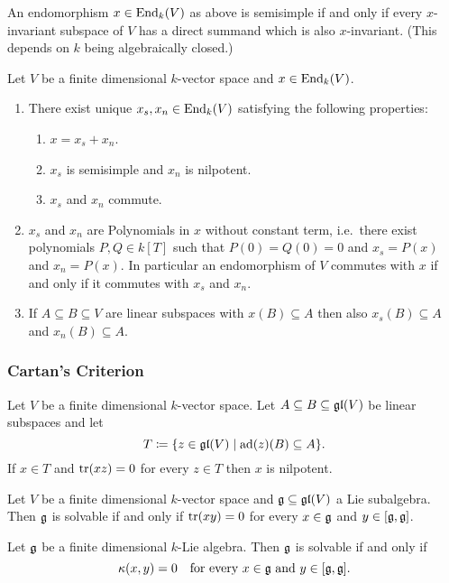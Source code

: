 \begin{rem}
 An endomorphism $x \in \operatorname{End}_k(V)$ as above is semisimple if and only if every $x$-invariant subspace of $V$ has a direct summand which is also $x$-invariant. (This depends on $k$ being algebraically closed.)
\end{rem}


\begin{thrm}
 Let $V$ be a finite dimensional $k$-vector space and $x \in \operatorname{End}_k(V)$.
 \begin{enumerate}[leftmargin=*]
  \item
   There exist unique $x_s, x_n \in \operatorname{End}_k(V)$ satisfying the following properties:
   \begin{enumerate}
    \item
     $x = x_s + x_n$.
    \item
     $x_s$ is semisimple and $x_n$ is nilpotent.
    \item
     $x_s$ and $x_n$ commute.
   \end{enumerate}
  \item
   $x_s$ and $x_n$ are Polynomials in $x$ without constant term, i.e.\ there exist polynomials $P,Q \in k[T]$ such that $P(0) = Q(0) = 0$ and $x_s = P(x)$ and $x_n = P(x)$. In particular an endomorphism of $V$ commutes with $x$ if and only if it commutes with $x_s$ and $x_n$.
  \item
   If $A \subseteq B \subseteq V$ are linear subspaces with $x(B) \subseteq A$ then also $x_s(B) \subseteq A$ and $x_n(B) \subseteq A$.
 \end{enumerate}
\end{thrm}







\subsubsection{Cartan’s Criterion}


\begin{lem}
 Let $V$ be a finite dimensional $k$-vector space. Let $A \subseteq B \subseteq \mathfrak{gl}(V)$ be linear subspaces and let
 \[
  T \coloneqq \{z \in \mathfrak{gl}(V) \mid \operatorname{ad}(z)(B) \subseteq A\}.
 \]
 If $x \in T$ and $\operatorname{tr}(xz) = 0$ for every $z \in T$ then $x$ is nilpotent.
\end{lem}


\begin{lem}
 Let $V$ be a finite dimensional $k$-vector space and $\mathfrak{g} \subseteq \mathfrak{gl}(V)$ a Lie subalgebra. Then $\mathfrak{g}$ is solvable if and only if $\operatorname{tr}(xy) = 0$ for every $x \in \mathfrak{g}$ and $y \in [\mathfrak{g},\mathfrak{g}]$.
\end{lem}


\begin{thrm}
 Let $\mathfrak{g}$ be a finite dimensional $k$-Lie algebra. Then $\mathfrak{g}$ is solvable if and only if
 \[
  \kappa(x,y) = 0 \quad \text{for every $x \in \mathfrak{g}$ and $y \in [\mathfrak{g},\mathfrak{g}]$}.
 \]
\end{thrm}













